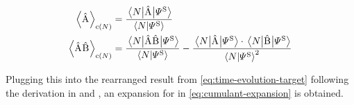 \begin{equation}
    \label{eq:cumulant-expansion-coefficients}
    \begin{split}
        \left\langle\Aop\right\rangle_{\text{c}(N)} &= \frac{ \bracketHelper{N}{\Aop}{\picturePsi[\schroedingerPicture]{}}}{\braketHelper{N}{\picturePsi[\schroedingerPicture]{}}}\\
        \left\langle\Aop\Bop\right\rangle_{\text{c}(N)} &= \frac{\bracketHelper{N}{\Aop\Bop}{\picturePsi[\schroedingerPicture]{}}}{\braketHelper{N}{\picturePsi[\schroedingerPicture]{}}} -  \frac{\bracketHelper{N}{\Aop}{\picturePsi[\schroedingerPicture]{}} \cdot \bracketHelper{N}{\Bop}{\picturePsi[\schroedingerPicture]{}}}{\braketHelper{N}{\picturePsi[\schroedingerPicture]{}}^2}\\
    \end{split}
\end{equation}

Plugging this into the rearranged result from \autoref{eq:time-evolution-target} following the derivation in \cite{variationalClassicalNetworksPaper} and \cite{isingDynamicsWithClassicalNetworks}, an expansion for \HNOft in \autoref{eq:cumulant-expansion} is obtained.

